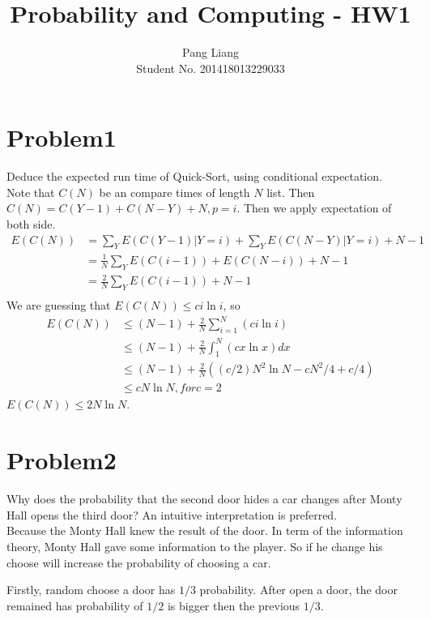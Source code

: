 \documentclass[12pt]{article}
\title{Probability and Computing - HW1}
\author{Pang Liang\\ Student No. 201418013229033}
\begin{document}
\maketitle

\section{Problem1}
Deduce the expected run time of Quick-Sort, using conditional expectation.\\

Note that $C(N)$ be an compare times of length $N$ list. Then $C(N) = C(Y-1)+C(N-Y)+N, p=i$. Then we apply expectation of both side.
\begin{equation}
    \begin{split}
    E(C(N)) &= \sum_Y E(C(Y-1) | Y=i) + \sum_Y E(C(N-Y) | Y=i) + N-1 \\
            &= \frac{1}{N} \sum_Y E(C(i-1)) + E(C(N-i)) + N-1 \\
            &= \frac{2}{N} \sum_Y E(C(i-1)) + N-1 \\
    \end{split}
\end{equation}
We are guessing that $E(C(N))\le ci \ln i$, so
\begin{equation}
    \begin{split}
    E(C(N)) &\le (N-1)+\frac{2}{N} \sum_{i=1}^{N}(c i \ln i) \\
            &\le (N-1)+\frac{2}{N} \int_{1}^{N} (c x \ln x) dx \\
            &\le (N-1)+\frac{2}{N}((c/2)N^2\ln N - cN^2/4+c/4)\\
            &\le cN \ln N, for c=2
    \end{split}
\end{equation}
$E(C(N)) \le 2N\ln N$.

\section{Problem2}
Why does the probability that the second door hides a car changes after Monty Hall opens the third door? An intuitive interpretation is preferred.\\

Because the Monty Hall knew the result of the door. In term of the information theory, Monty Hall gave some information to the player. So if he change his choose will increase the probability of choosing a car.

Firstly, random choose a door has $1/3$ probability. After open a door, the door remained has probability of $1/2$ is bigger then the previous $1/3$.
\end{document}
